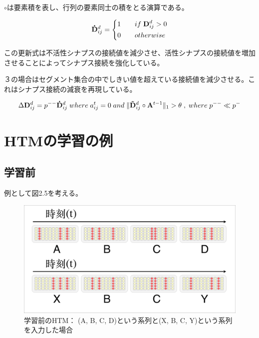 $\circ$は要素積を表し、行列の要素同士の積をとる演算である。

\begin{equation}
  {\bf \dot{D}}^d_{ij} =
  \left\{
  \begin{alignedat}{2}
    1 \qquad &if \; {\bf D}^d_{ij} > 0\\
    0 \qquad &otherwise
  \end{alignedat}
  \right.
\end{equation}

この更新式は不活性シナプスの接続値を減少させ、活性シナプスの接続値を増加させることによってシナプス接続を強化している。

３の場合はセグメント集合の中でしきい値を超えている接続値を減少させる。これはシナプス接続の減衰を再現している。

\begin{equation}
  \Delta {\bf D}^d_{ij} = p^{--}{\bf \dot{D}}^d_{ij} \; where \; a^t_{ij} = 0 \; and \; \|{\bf \tilde{D}}^d_{ij} \circ {\bf A}^{t-1}\|_1 > \theta \; , \; where \; p^{--} \ll p^-
\end{equation}

\section{HTMの学習の例}

\subsection{学習前}
例として図2.5を考える。

\begin{figure}[ht]
  \begin{center}
    \includegraphics[width=14cm]{./fig/drawing_5}
    \caption{学習前のHTM： (A, B, C, D)という系列と(X, B, C, Y)という系列を入力した場合}
    \label{fig:HTM_before_learning}
  \end{center}
\end{figure}

